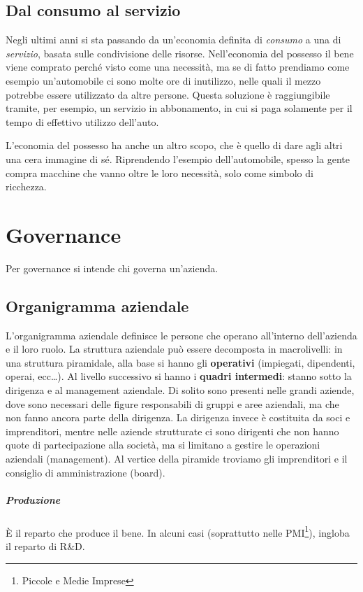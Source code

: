 \section{Dal consumo al servizio} 

Negli ultimi anni si sta passando da un'economia definita di \textit{consumo} a
una di \textit{servizio}, basata sulle condivisione delle risorse.
Nell'economia del possesso il bene viene comprato perché visto come una
necessità, ma se di fatto prendiamo come esempio un'automobile ci sono molte ore
di inutilizzo, nelle quali il mezzo potrebbe essere utilizzato da altre persone.
Questa soluzione è raggiungibile tramite, per esempio, un servizio in
abbonamento, in cui si paga solamente per il tempo di effettivo utilizzo 
dell'auto.

L'economia del possesso ha anche un altro scopo, che è quello di dare agli altri
una cera immagine di sé. Riprendendo l'esempio dell'automobile, spesso la gente
compra macchine che vanno oltre le loro necessità, solo come simbolo di 
ricchezza.


\chapter{Governance}

Per governance si intende chi governa un'azienda.

\section{Organigramma aziendale}
L'organigramma aziendale definisce le persone che operano all'interno
dell'azienda e il loro ruolo. La struttura aziendale può essere decomposta in
macrolivelli: in una struttura piramidale, alla base si hanno gli
\textbf{operativi} (impiegati, dipendenti, operai, ecc\dots). Al livello
successivo si hanno i \textbf{quadri intermedi}: stanno sotto la dirigenza e al
management aziendale. Di solito sono presenti nelle grandi aziende, dove sono
necessari delle figure responsabili di gruppi e aree aziendali, ma che non
fanno ancora parte della dirigenza. La dirigenza invece è costituita da soci e
imprenditori, mentre nelle aziende strutturate ci sono dirigenti che non hanno
quote di partecipazione alla società, ma si limitano a gestire le operazioni
aziendali (management). Al vertice della piramide troviamo gli imprenditori 
e il consiglio di amministrazione (board).

\paragraph*{Produzione} È il reparto che produce il bene. In alcuni casi
(soprattutto nelle PMI\footnote{Piccole e Medie Imprese}), ingloba il
reparto di R\&D.

